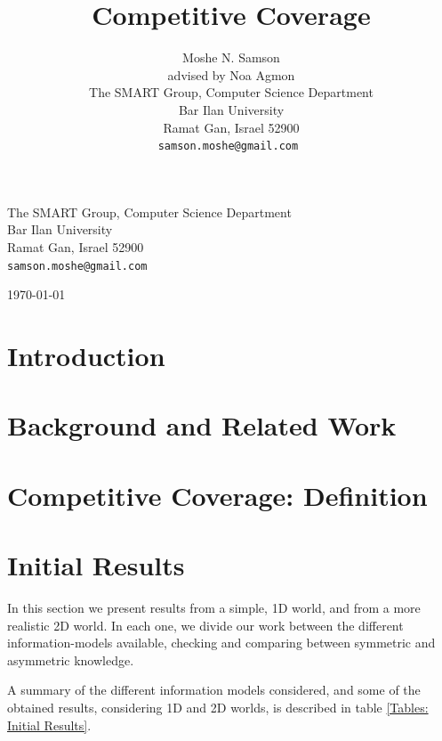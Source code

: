 \documentclass[a4paper,english,10pt]{article}
\begin{document}
\begin{titlepage}
\begin{center}
\vfill


\large{The SMART Group, Computer Science Department\\
Bar Ilan University\\
Ramat Gan, Israel 52900\\
\tt\small samson.moshe@gmail.com}

\vfill

\today

\end{center}
\end{titlepage}

\title{Competitive Coverage}
\author{Moshe N. Samson\\
advised by Noa Agmon\\
The SMART Group, Computer Science Department\\
Bar Ilan University\\
Ramat Gan, Israel 52900\\
\tt\small samson.moshe@gmail.com
}

\tableofcontents
\maketitle

\section{Introduction}


\section{Background and Related Work}


\section{Competitive Coverage: Definition}



\section{Initial Results}
In this section we present results from a simple, 1D world, and from a more realistic 2D world. In each one, we divide our work between the different information-models available, checking and comparing between symmetric and asymmetric knowledge.

A summary of the different information models considered, and some of the obtained results, considering 1D and 2D worlds, is described in table \ref{Tables: Initial Results}.
  
\end{document}
